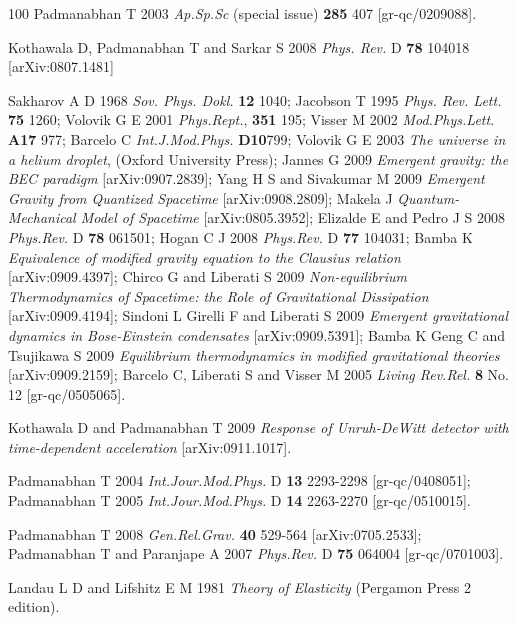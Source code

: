 \documentclass[12pt]{iopart}
\begin{document}
\begin{thebibliography}{100}
Padmanabhan T 2003  \textit{Ap.Sp.Sc} (special issue)   \textbf{285} 407  [gr-qc/0209088].




Kothawala D,  Padmanabhan T  and Sarkar S  2008 
        \textit{Phys. Rev.} D \textbf{78}  104018  [arXiv:0807.1481]
       
Sakharov A D  1968  \textit{Sov. Phys. Dokl.} {\bf 12} 1040;
Jacobson T  1995 \textit{Phys. Rev. Lett.} \textbf{75}  1260;
Volovik G E  2001 \textit{Phys.Rept.}, \textbf{351} 195; 
Visser M 2002 \textit{Mod.Phys.Lett}. \textbf{A17}  977; 
Barcelo C  \textit{Int.J.Mod.Phys.} \textbf{D10}799;
Volovik G E  2003 \textit{The universe in a helium droplet}, (Oxford University Press); 
Jannes G 2009 \textit{Emergent gravity: the BEC paradigm} [arXiv:0907.2839];
Yang H S and Sivakumar M 2009 \textit{Emergent Gravity from Quantized Spacetime}                 [arXiv:0908.2809];
Makela J  \textit{Quantum-Mechanical Model of Spacetime} [arXiv:0805.3952];
Elizalde E and   Pedro J S 2008 \textit{Phys.Rev.} D \textbf{78} 061501;
Hogan C J 2008 \textit{Phys.Rev.} D \textbf{77} 104031;
Bamba K  \textit{Equivalence of modified gravity equation to the Clausius                   relation} [arXiv:0909.4397];
Chirco G and    Liberati  S 2009 \textit{Non-equilibrium Thermodynamics of Spacetime: 
      the  Role of Gravitational Dissipation} [arXiv:0909.4194];
Sindoni L Girelli F and  Liberati S 2009   \textit{Emergent gravitational dynamics
        in Bose-Einstein condensates}  [arXiv:0909.5391];
Bamba K  Geng C and   Tsujikawa S 2009  \textit{Equilibrium thermodynamics in 
        modified gravitational theories} [arXiv:0909.2159];
Barcelo C,  Liberati S and Visser M 2005
 \textit{Living Rev.Rel.} \textbf{8} No. 12 [gr-qc/0505065]. 


Kothawala D and Padmanabhan T 2009 \textit{Response of Unruh-DeWitt detector with time-dependent acceleration} [arXiv:0911.1017].


Padmanabhan T 2004 \textit{Int.Jour.Mod.Phys.} D \textbf{13} 2293-2298 [gr-qc/0408051]; 
Padmanabhan T 2005 \textit{Int.Jour.Mod.Phys.} D \textbf{14} 2263-2270 [gr-qc/0510015]. 


Padmanabhan T   2008 \textit{Gen.Rel.Grav.}   \textbf{40} 529-564 [arXiv:0705.2533];
Padmanabhan T  and Paranjape A 2007 \textit{Phys.Rev.} D \textbf{75} 064004 [gr-qc/0701003].

Landau  L D and Lifshitz  E M 1981 \textit{Theory of Elasticity} (Pergamon Press 2 edition).
 

\end{thebibliography}
\end{document}
